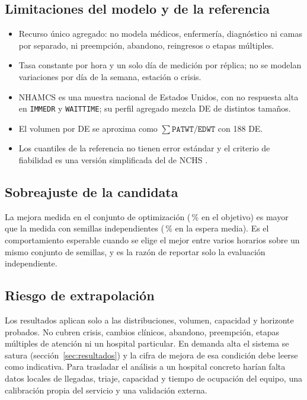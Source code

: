 \subsection{Limitaciones del modelo y de la referencia}
\begin{itemize}
  \item Recurso único agregado: no modela médicos, enfermería, diagnóstico ni camas por
  separado, ni preempción, abandono, reingresos o etapas múltiples.
  \item Tasa constante por hora y un solo día de medición por réplica; no se modelan
  variaciones por día de la semana, estación o crisis.
  \item NHAMCS es una muestra nacional de Estados Unidos, con no respuesta alta en
  \texttt{IMMEDR} y \texttt{WAITTIME}; su perfil agregado mezcla DE de distintos tamaños.
  \item El volumen por DE se aproxima como $\sum \texttt{PATWT}/\texttt{EDWT}$ con 188 DE.
  \item Los cuantiles de la referencia no tienen error estándar y el criterio de
  fiabilidad es una versión simplificada del de NCHS \citep{parker2017standards}.
\end{itemize}

\subsection{Sobreajuste de la candidata}
La mejora medida en el conjunto de optimización (\OptRelPct\,\% en el objetivo) es mayor
que la medida con semillas independientes (\RedPctNom\,\% en la espera media). Es el
comportamiento esperable cuando se elige el mejor entre varios horarios sobre un mismo
conjunto de semillas, y es la razón de reportar solo la evaluación independiente.

\subsection{Riesgo de extrapolación}
Los resultados aplican solo a las distribuciones, volumen, capacidad y horizonte probados.
No cubren crisis, cambios clínicos, abandono, preempción, etapas múltiples de atención ni un
hospital particular. En demanda alta el sistema se satura (sección~\ref{sec:resultados}) y la
cifra de mejora de esa condición debe leerse como indicativa. Para trasladar el análisis a
un hospital concreto harían falta datos locales de llegadas, triaje, capacidad y tiempo de
ocupación del equipo, una calibración propia del servicio y una validación externa.
